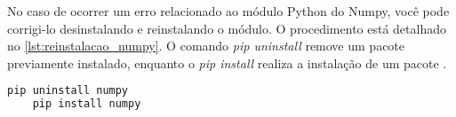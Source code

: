 No caso de ocorrer um erro relacionado ao módulo Python do Numpy, você pode corrigi-lo desinstalando e reinstalando o módulo. O procedimento está detalhado no \cref{lst:reinstalacao_numpy}. O comando \emph{pip uninstall} remove um pacote previamente instalado, enquanto o \emph{pip install} realiza a instalação de um pacote \cite{pip_install, pip_uninstall}.

\begin{lstlisting}[caption={Trecho de código com os comandos para reinstalação do Numpy},label={lst:reinstalacao_numpy},language=Bash,showstringspaces=false]
    pip uninstall numpy
    pip install numpy
\end{lstlisting}

